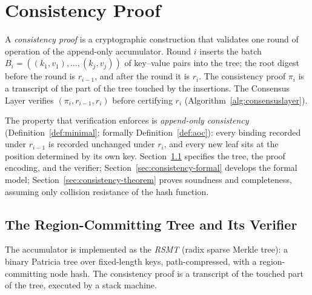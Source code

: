 \documentclass[twocolumn]{article}
\begin{document}
\section{Consistency Proof}
\label{sec:consistency-proof}

A \emph{consistency proof} is a cryptographic construction that validates one round of operation of the append-only accumulator. Round $i$ inserts the batch $B_i = ((k_1, v_1), \ldots, (k_j, v_j))$ of key--value pairs into the tree; the root digest before the round is $r_{i-1}$, and after the round it is $r_i$. The consistency proof $\pi_i$ is a transcript of the part of the tree touched by the insertions. The Consensus Layer verifies $(\pi_i, r_{i-1}, r_i)$ before certifying $r_i$ (Algorithm~\ref{alg:consensuslayer}).

The property that verification enforces is \emph{append-only consistency} (Definition~\ref{def:minimal}; formally Definition~\ref{def:aoc}): every binding recorded under $r_{i-1}$ is recorded unchanged under $r_i$, and every new leaf sits at the position determined by its own key. Section~\ref{sec:stack-verifier} specifies the tree, the proof encoding, and the verifier; Section~\ref{sec:consistency-formal} develops the formal model; Section~\ref{sec:consistency-theorem} proves soundness and completeness, assuming only collision resistance of the hash function.

\subsection{The Region-Committing Tree and Its Verifier}
\label{sec:stack-verifier}

The accumulator is implemented as the \emph{RSMT} (radix sparse Merkle tree): a binary Patricia tree over fixed-length keys, path-compressed, with a region-committing node hash. The consistency proof is a transcript of the touched part of the tree, executed by a stack machine.
\end{document}
